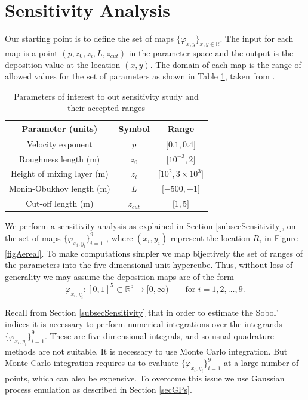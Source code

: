 \documentclass{sfuthesis}
\begin{document}
\section{Sensitivity Analysis}
Our starting point is to define the set of  maps $\{\varphi_{x,y}\}_{x,y\in\mathbb{R}}$. The input
for each map is a point $(p,z_{0},z_{i},L,z_{cut})$ in the parameter space
and the output is the deposition value at the location $(x,y)$. The domain
of each map is the
range of allowed values for the set of parameters as shown in Table  \ref{tabRanges}, taken from \cite{seinfeld1998atmospheric}.


\begin{table}[H]
\centering
\begin{tabular}{|c|c|c|}
\hline 
Parameter (units) & Symbol & Range\tabularnewline
\hline 
\hline 
Velocity exponent  & $p$ & ${[}0.1,0.4{]}$\tabularnewline
\hline 
Roughness length (m) & $z_{0}$ & ${[}10^{-3} ,2{]}$\tabularnewline
\hline 
Height of mixing layer (m) & $z_{i}$ & ${[}10^{2},3\times 10^{3}{]}$\tabularnewline
\hline 
Monin-Obukhov length (m) & $L$ & ${[}-500,-1{]}$\tabularnewline
\hline 
Cut-off length (m) & $z_{cut}$ & ${[}1,5{]}$\tabularnewline
\hline 
\end{tabular}
\caption{Parameters of interest to out sensitivity  study and their accepted ranges}
\label{tabRanges}
\end{table}
We perform a sensitivity analysis as explained in Section \ref{subsecSensitivity},
on the set of maps $\{\varphi_{x_{i},y_{i}}\}_{i=1}^{9}$ ,
where $(x_{i},y_{i})$ represent the location $R_{i}$ in Figure \ref{figAereal}.
To make computations
simpler we map bijectively the set of ranges of the parameters into the five-dimensional
unit hypercube. Thus, without loss of generality we may assume the deposition maps are of the form 
\begin{equation*}
\varphi_{x_{i},y_{i}}:[0,1]^{5}\subset\mathbb{R}^{5}\rightarrow [0,\infty)\qquad\text{for }i=1,2,\ldots,9.
\end{equation*} 

Recall from  Section \ref{subsecSensitivity} that in order to estimate the
Sobol' indices it is necessary to perform numerical integrations over the integrands $\{\varphi_{x_{i},y_{i}}\}_{i=1}^{9}$.
These are five-dimensional integrals, and so usual  quadrature methods are not suitable. It is
necessary to use Monte Carlo integration. But Monte Carlo integration requires us to evaluate 
$\{\varphi_{x_{i},y_{i}}\}_{i=1}^{9}$ at a large number of points, which can also be expensive.
To overcome this issue we use Gaussian process emulation as described in Section \ref{secGPs}.
\end{document}
